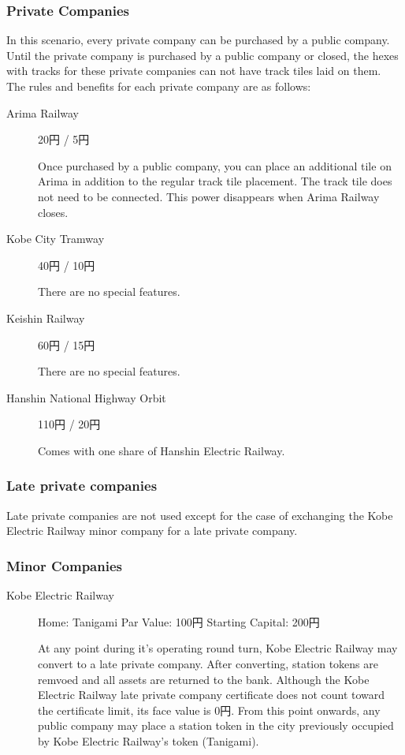 \documentclass{article}
\begin{document}
\begin{CJK}{UTF8}{min}
\begin{multicols}{2}
\subsubsection{Private Companies}

In this scenario, every private company can be purchased by a public
company. Until the private company is purchased by a public company or
closed, the hexes with tracks for these private companies can not have
track tiles laid on them. The rules and benefits for each private
company are as follows:

\begin{description}
\item[Arima Railway] 20円 / 5円

  Once purchased by a public company, you can place an additional tile
  on Arima in addition to the regular track tile placement. The track
  tile does not need to be connected. This power disappears when Arima
  Railway closes.

\item[Kobe City Tramway] 40円 / 10円

  There are no special features.

\item[Keishin Railway]  60円 / 15円

  There are no special features.

\item[Hanshin National Highway Orbit] 110円 / 20円

  Comes with one share of Hanshin Electric Railway.
\end{description}

\subsubsection{Late private companies}

Late private companies are not used except for the case of exchanging
the Kobe Electric Railway minor company for a late private company.

\subsubsection{Minor Companies}
\begin{description}
\item[Kobe Electric Railway] \hfill

  Home: Tanigami \hfill Par Value: 100円  \hfill Starting Capital: 200円

  At any point during it's operating round turn, Kobe Electric Railway
  may convert to a late private company. After converting, station
  tokens are remvoed and all assets are returned to the bank. Although
  the Kobe Electric Railway late private company certificate does not
  count toward the certificate limit, its face value is 0円. From
  this point onwards, any public company may place a station token in
  the city previously occupied by Kobe Electric Railway's token
  (Tanigami).


\end{description}
\end{multicols}
\end{CJK}
\end{document}
